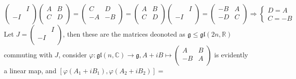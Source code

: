 \documentclass[main]{subfiles}
\newcommand{\<}[1]{\langle #1 \rangle}
\begin{document}
\begin{exercise}
\begin{enumerate}[label=(\alph*),leftmargin=*]

\end{enumerate}
\end{exercise}

$$
\left( {\begin{array}{cc}
   & I \\
-I &  \\
\end{array} } \right)
\left( {\begin{array}{cc}
A & B \\
C & D \\
\end{array} } \right)=
\left( {\begin{array}{cc}
C & D \\
-A & -B \\
\end{array} } \right)=
\left( {\begin{array}{cc}
A & B \\
C & D \\
\end{array} } \right)
\left( {\begin{array}{cc}
   & I \\
-I &  \\
\end{array} } \right)=
\left( {\begin{array}{cc}
-B & A \\
-D & C \\
\end{array} } \right)\Rightarrow
\begin{cases}
D=A \\
C=-B
\end{cases}
$$
Let $J=
\left( {\begin{array}{cc}
   & I \\
-I &  \\
\end{array} } \right)$, then these are the matrices deonoted as $\mathfrak{g}\leq\mathfrak{gl}(2n,\mathbb R)$ commuting with $J$, consider $\varphi:\mathfrak{gl}(n,\mathbb C)\rightarrow \mathfrak{g}, A+iB\mapsto
\left( {\begin{array}{cc}
A & B \\
-B & A \\
\end{array} } \right)$ is evidently a linear map, and $[\varphi(A_1+iB_1),\varphi(A_2+iB_2)]=$\par
\end{document}
